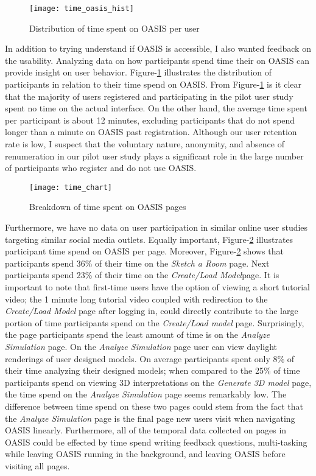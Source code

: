 \begin{figure}[h]
	\centering
	\texttt{[image: time\_oasis\_hist]}
	\caption{Distribution of time spent on OASIS per user}
	\label{fig:time_oasis_hist}
\end{figure}

In addition to trying understand if OASIS is accessible, I also wanted feedback on the usability.
Analyzing data on how participants spend time their on OASIS can provide insight on user behavior.
Figure-\ref{fig:time_oasis_hist} illustrates the distribution of participants in relation to their time spend on OASIS.
From Figure-\ref{fig:time_oasis_hist} is it clear that the majority of users registered and participating in the pilot user study spent no time on the actual interface.
On the other hand, the average time spent per participant is about 12 minutes, excluding participants that do not spend longer than a minute on OASIS past registration.
Although our user retention rate is low, I suspect that the voluntary nature, anonymity, and absence of renumeration in our pilot user study plays a significant role in the large number of participants who register and do not use OASIS.

\begin{figure}[h]
	\centering
	\texttt{[image: time\_chart]}
	\caption{Breakdown of time spent on OASIS pages}
	\label{fig:time_chart}
\end{figure}

Furthermore, we have no data on user participation in similar online user studies targeting similar social media outlets.
Equally important, Figure-\ref{fig:time_chart} illustrates participant time spend on OASIS per page.
Moreover, Figure-\ref{fig:time_chart} shows that participants spend 36\% of their time on the \textit{ Sketch a Room} page.
Next participants spend 23\% of their time on the \textit{Create/Load Model}page.
It is important to note that first-time users have the option of viewing a short tutorial video; 
the 1 minute long tutorial video coupled with redirection to the \textit{Create/Load Model} page after logging in, could directly contribute to the large portion of time participants spend on the \textit{Create/Load model} page.
Surprisingly, the page participants spend the least amount of time is on the \textit{Analyze Simulation} page. 
On the \textit{Analyze Simulation} page user can view daylight renderings of user designed models.
On average participants spent only 8\% of their time analyzing their designed models;
when compared to the 25\% of time participants spend on viewing 3D interpretations on the \textit{Generate 3D model} page, the time spend on the \textit{Analyze Simulation} page seems remarkably low.
The difference between time spend on these two pages could stem from the fact that the \textit{Analyze Simulation} page is the final page new users visit when navigating OASIS linearly.
Furthermore, all of the temporal data collected on pages in OASIS could be effected by time spend writing feedback questions, multi-tasking while leaving OASIS running in the background, and leaving OASIS before visiting all pages.
 
